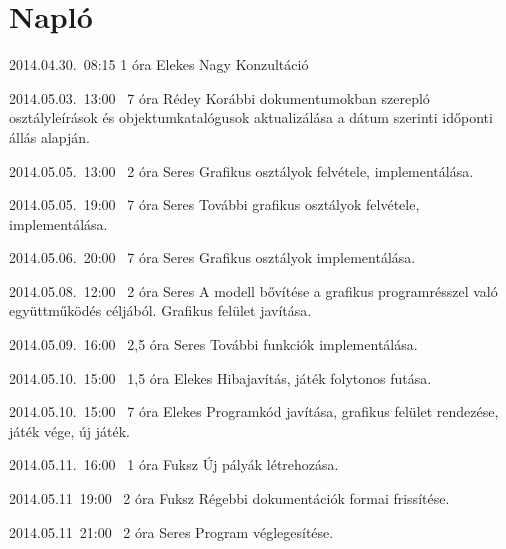 %
\section{Napló}

\begin{naplo}

\bejegyzes
{2014.04.30.~08:15}
{1 óra}
{Elekes\newline
Nagy}
{Konzultáció}

\bejegyzes
{2014.05.03.~13:00~}
{7 óra}
{Rédey}
{Korábbi dokumentumokban szerepló osztályleírások és objektumkatalógusok aktualizálása a dátum szerinti időponti állás alapján.}

\bejegyzes
{2014.05.05.~13:00~}
{2 óra}
{Seres}
{Grafikus osztályok felvétele, implementálása.}

\bejegyzes
{2014.05.05.~19:00~}
{7 óra}
{Seres}
{További grafikus osztályok felvétele, implementálása.}

\bejegyzes
{2014.05.06.~20:00~}
{7 óra}
{Seres}
{Grafikus osztályok implementálása.}

\bejegyzes
{2014.05.08.~12:00~}
{2 óra}
{Seres}
{A modell bővítése a grafikus programrésszel való együttműködés céljából. Grafikus felület javítása.}

\bejegyzes
{2014.05.09.~16:00~}
{2,5 óra}
{Seres}
{További funkciók implementálása.}

\bejegyzes
{2014.05.10.~15:00~}
{1,5 óra}
{Elekes}
{Hibajavítás, játék folytonos futása.}

\bejegyzes
{2014.05.10.~15:00~}
{7 óra}
{Elekes}
{ Programkód javítása, grafikus felület rendezése, játék vége, új játék. }

\bejegyzes
{2014.05.11.~16:00~}
{1 óra}
{Fuksz}
{Új pályák létrehozása.}

\bejegyzes
{2014.05.11~19:00~}
{2 óra}
{Fuksz}
{Régebbi dokumentációk formai frissítése.}

\bejegyzes
{2014.05.11~21:00~}
{2 óra}
{Seres}
{Program véglegesítése.}

\end{naplo}

